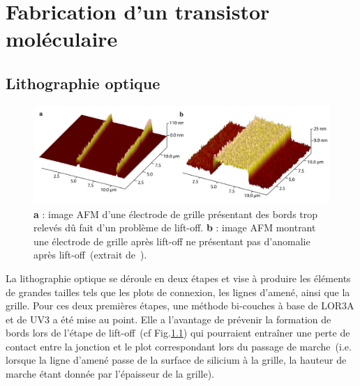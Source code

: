 \chapter{Fabrication d'un transistor moléculaire}

\section{Lithographie optique}


\begin{figure}
\centering \includegraphics[scale=0.45]{Fabrication/BatmanGrille/BatmanGrille.pdf}
\caption{\textbf{a} : image AFM d'une électrode de grille présentant des bords trop relevés d\^u fait d'un problème de lift-off. \textbf{b} : image AFM montrant une électrode de grille après lift-off ne présentant pas d'anomalie après lift-off~(extrait de~\cite{RochPhD}).}
\label{lift-off}
\end{figure}


La lithographie optique se déroule en deux étapes et vise à produire les éléments de grandes tailles tels que les plots de connexion, les lignes d'amené, ainsi que la grille. Pour ces deux premières étapes, une méthode bi-couches à base de LOR3A et de UV3 a été mise au point. Elle a l'avantage de prévenir la formation de bords lors de l'étape de lift-off~(cf Fig.\ref{lift-off}) qui pourraient entraîner une perte de contact entre la jonction et le plot correspondant lors du passage de marche~(i.e. lorsque la ligne d'amené passe de la surface de silicium à la grille, la hauteur de marche étant donnée par l'épaisseur de la grille).




